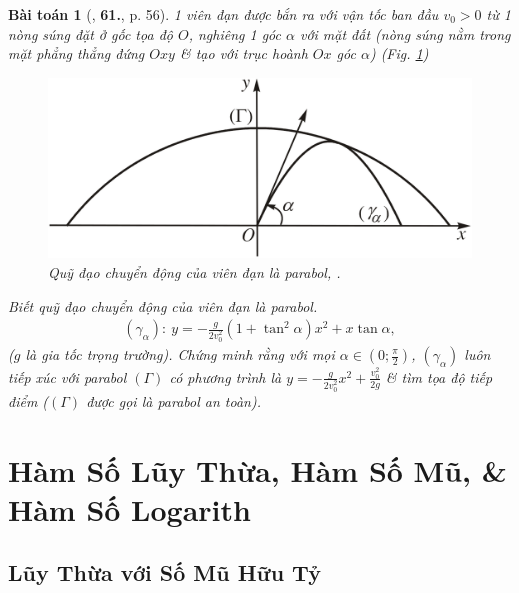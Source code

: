 \documentclass[oneside]{book}
\numberwithin{equation}{section}
\newtheorem{baitoan}{Bài toán}[section]
\begin{document}
\begin{baitoan}[\cite{SGK_Toan_12_giai_tich_nang_cao}, \textbf{61.}, p. 56]
	1 viên đạn được bắn ra với vận tốc ban đầu $v_0 > 0$ từ 1 nòng súng đặt ở gốc tọa độ $O$, nghiêng 1 góc $\alpha$ với mặt đất (nòng súng nằm trong mặt phẳng thẳng đứng $Oxy$ \& tạo với trục hoành $Ox$ góc $\alpha$) (Fig. \ref{fig:quy_dao_chuyen_dong_cua_vien_dan})
	
	\begin{figure}[H]
		\centering
		\includegraphics[scale=0.15]{quy_dao_chuyen_dong_cua_vien_dan}
		\caption{Quỹ đạo chuyển động của viên đạn là parabol, \cite[Hình 1.21, p. 56]{SGK_Toan_12_giai_tich_nang_cao}.}
		\label{fig:quy_dao_chuyen_dong_cua_vien_dan}
	\end{figure}
	Biết quỹ đạo chuyển động của viên đạn là parabol.
	\begin{align*}
		(\gamma_\alpha):\ y = -\frac{g}{2v_0^2}(1 + \tan^2\alpha)x^2 + x\tan\alpha,
	\end{align*}
	($g$ là \emph{gia tốc trọng trường}). Chứng minh rằng với mọi $\alpha\in\left(0;\frac{\pi}{2}\right)$, $(\gamma_\alpha)$ luôn tiếp xúc với parabol $(\Gamma)$ có phương trình là $y = -\frac{g}{2v_0^2}x^2 + \frac{v_0^2}{2g}$ \& tìm tọa độ tiếp điểm ($(\Gamma)$ được gọi là \emph{parabol an toàn}).
\end{baitoan}


\chapter{Hàm Số Lũy Thừa, Hàm Số Mũ, \& Hàm Số Logarith}

\section{Lũy Thừa với Số Mũ Hữu Tỷ}

\end{document}
